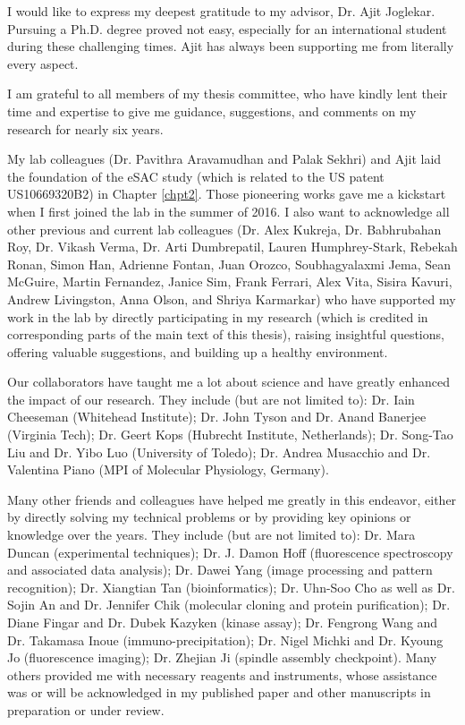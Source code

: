 I would like to express my deepest gratitude to my advisor, Dr. Ajit Joglekar. Pursuing a Ph.D. degree proved not easy, especially for an international student during these challenging times. Ajit has always been supporting me from literally every aspect.

I am grateful to all members of my thesis committee, who have kindly lent their time and expertise to give me guidance, suggestions, and comments on my research for nearly six years.

My lab colleagues (Dr. Pavithra Aravamudhan and Palak Sekhri) and Ajit laid the foundation of the eSAC study (which is related to the US patent US10669320B2) in Chapter \ref{chpt2}. Those pioneering works gave me a kickstart when I first joined the lab in the summer of 2016. I also want to acknowledge all other previous and current lab colleagues (Dr. Alex Kukreja, Dr. Babhrubahan Roy, Dr. Vikash Verma, Dr. Arti Dumbrepatil, Lauren Humphrey-Stark, Rebekah Ronan, Simon Han,  Adrienne Fontan, Juan Orozco, Soubhagyalaxmi Jema, Sean McGuire, Martin Fernandez, Janice Sim, Frank Ferrari, Alex Vita, Sisira Kavuri, Andrew Livingston, Anna Olson, and Shriya Karmarkar) who have supported my work in the lab by directly participating in my research (which is credited in corresponding parts of the main text of this thesis), raising insightful questions, offering valuable suggestions, and building up a healthy environment.

Our collaborators have taught me a lot about science and have greatly enhanced the impact of our research. They include (but are not limited to): Dr. Iain Cheeseman (Whitehead Institute); Dr. John Tyson and Dr. Anand Banerjee (Virginia Tech); Dr. Geert Kops (Hubrecht Institute, Netherlands); Dr. Song-Tao Liu and Dr. Yibo Luo (University of Toledo); Dr. Andrea Musacchio and Dr. Valentina Piano (MPI of Molecular Physiology, Germany).

Many other friends and colleagues have helped me greatly in this endeavor, either by directly solving my technical problems or by providing key opinions or knowledge over the years. They include (but are not limited to): Dr. Mara Duncan (experimental techniques); Dr. J. Damon Hoff (fluorescence spectroscopy and associated data analysis); Dr. Dawei Yang (image processing and pattern recognition); Dr. Xiangtian Tan (bioinformatics); Dr. Uhn-Soo Cho as well as Dr. Sojin An and Dr. Jennifer Chik (molecular cloning and protein purification); Dr. Diane Fingar and Dr. Dubek Kazyken (kinase assay); Dr. Fengrong Wang and Dr. Takamasa Inoue (immuno-precipitation); Dr. Nigel Michki and Dr. Kyoung Jo (fluorescence imaging); Dr. Zhejian Ji (spindle assembly checkpoint). Many others provided me with necessary reagents and instruments, whose assistance was or will be acknowledged in my published paper \cite{eSAC} and other manuscripts in preparation or under review.

